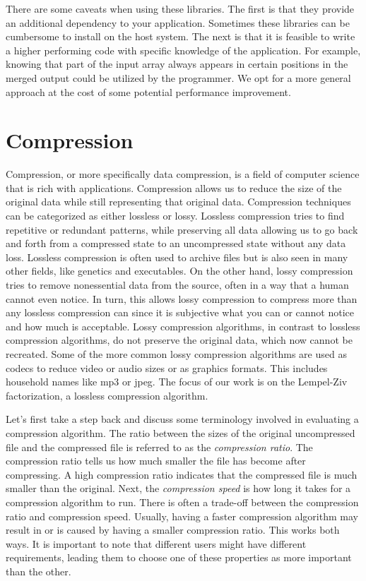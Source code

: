 There are some caveats when using these libraries.
The first is that they provide an additional dependency to your application.
Sometimes these libraries can be cumbersome to install on the host system.
The next is that it is feasible to write a higher performing code with specific knowledge of the application.
For example, knowing that part of the input array always appears in certain positions in the merged output could be utilized by the programmer.
We opt for a more general approach at the cost of some potential performance improvement.

\section{Compression}

Compression, or more specifically data compression, is a field of computer science that is rich with applications.
Compression allows us to reduce the size of the original data while still representing that original data.
Compression techniques can be categorized as either lossless or lossy.
Lossless compression tries to find repetitive or redundant patterns, while preserving all data allowing us to go back and forth from a compressed state to an uncompressed state without any data loss. 
Lossless compression is often used to archive files but is also seen in many other fields, like genetics and executables.
On the other hand, lossy compression tries to remove nonessential data from the source, often in a way that a human cannot even notice.
In turn, this allows lossy compression to compress more than any lossless compression can since it is subjective what you can or cannot notice and how much is acceptable.
Lossy compression algorithms, in contrast to lossless compression algorithms, do not preserve the original data, which now cannot be recreated.
Some of the more common lossy compression algorithms are used as codecs to reduce video or audio sizes or as graphics formats.
This includes household names like mp3 or jpeg.
The focus of our work is on the Lempel-Ziv factorization, a lossless compression algorithm.

Let's first take a step back and discuss some terminology involved in evaluating a compression algorithm.
The ratio between the sizes of the original uncompressed file and the compressed file is referred to as the \textit{compression ratio}.
The compression ratio tells us how much smaller the file has become after compressing.
A high compression ratio indicates that the compressed file is much smaller than the original.
Next, the \textit{compression speed} is how long it takes for a compression algorithm to run.
There is often a trade-off between the compression ratio and compression speed.
Usually, having a faster compression algorithm may result in or is caused by having a smaller compression ratio.
This works both ways.
It is important to note that different users might have different requirements, leading them to choose one of these properties as more important than the other.

